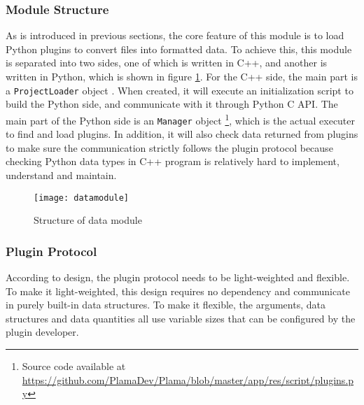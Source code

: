 \subsubsection{Module Structure}

As is introduced in previous sections, the core feature of this module is to load Python plugins to convert files into formatted data. To achieve this, this module is separated into two sides, one of which is written in C++, and another is written in Python, which is shown in figure \ref{fig:datamodule}. For the C++ side, the main part is a \texttt{ProjectLoader} object . When created, it will execute an initialization script to build the Python side, and communicate with it through Python C API. The main part of the Python side is an \texttt{Manager} object \footnote{\label{ftnt:plugin}Source code available at \url{https://github.com/PlamaDev/Plama/blob/master/app/res/script/plugins.py}}, which is the actual executer to find and load plugins. In addition, it will also check data returned from plugins to make sure the communication strictly follows the plugin protocol because checking Python data types in C++ program is relatively hard to implement, understand and maintain.

\begin{figure}[!htb]
	\centering
	\texttt{[image: datamodule]}
	\caption{Structure of data module}
	\label{fig:datamodule}
\end{figure}

\subsubsection{Plugin Protocol}

According to design, the plugin protocol needs to be light-weighted and flexible. To make it light-weighted, this design requires no dependency and communicate in purely built-in data structures. To make it flexible, the arguments, data structures and data quantities all use variable sizes that can be configured by the plugin developer.


